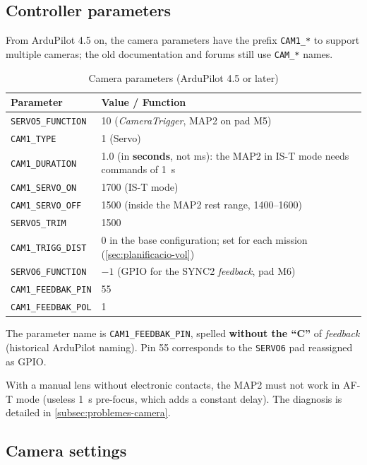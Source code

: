 \subsection{Controller parameters}

From ArduPilot 4.5 on, the camera parameters have the prefix \texttt{CAM1\_*} to support multiple cameras; the old documentation and forums still use \texttt{CAM\_*} names.

\begin{table}[H]
    \centering
    \caption{Camera parameters (ArduPilot 4.5 or later)}
    \label{tab:params-camera}
    \begin{tabular}{lP{9.5cm}}
        \toprule
        Parameter & Value / Function \\
        \midrule
        \texttt{SERVO5\_FUNCTION} & 10 (\emph{CameraTrigger}, MAP2 on pad M5) \\
        \texttt{CAM1\_TYPE} & 1 (Servo) \\
        \texttt{CAM1\_DURATION} & 1.0 (in \textbf{seconds}, not ms): the MAP2 in IS-T mode needs commands of 1~s \\
        \texttt{CAM1\_SERVO\_ON} & 1700 (IS-T mode) \\
        \texttt{CAM1\_SERVO\_OFF} & 1500 (inside the MAP2 rest range, 1400--1600) \\
        \texttt{SERVO5\_TRIM} & 1500 \\
        \texttt{CAM1\_TRIGG\_DIST} & 0 in the base configuration; set for each mission (\cref{sec:planificacio-vol}) \\
        \texttt{SERVO6\_FUNCTION} & $-1$ (GPIO for the SYNC2 \emph{feedback}, pad M6) \\
        \texttt{CAM1\_FEEDBAK\_PIN} & 55 \\
        \texttt{CAM1\_FEEDBAK\_POL} & 1 \\
        \bottomrule
    \end{tabular}
\end{table}

The parameter name is \texttt{CAM1\_FEEDBAK\_PIN}, spelled \textbf{without the ``C''} of \emph{feedback} (historical ArduPilot naming). Pin 55 corresponds to the \texttt{SERVO6} pad reassigned as GPIO.

With a manual lens without electronic contacts, the MAP2 must not work in AF-T mode (useless 1~s pre-focus, which adds a constant delay). The diagnosis is detailed in \cref{subsec:problemes-camera}.

\subsection{Camera settings}
\label{subsec:ajust-camera}

